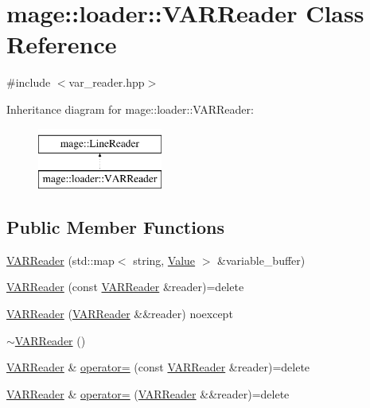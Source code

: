 \hypertarget{classmage_1_1loader_1_1_v_a_r_reader}{}\section{mage\+:\+:loader\+:\+:V\+A\+R\+Reader Class Reference}
\label{classmage_1_1loader_1_1_v_a_r_reader}


{\ttfamily \#include $<$var\+\_\+reader.\+hpp$>$}

Inheritance diagram for mage\+:\+:loader\+:\+:V\+A\+R\+Reader\+:\begin{figure}[H]
\begin{center}
\leavevmode
\includegraphics[height=2.000000cm]{classmage_1_1loader_1_1_v_a_r_reader}
\end{center}
\end{figure}
\subsection*{Public Member Functions}
\begin{DoxyCompactItemize}
\item 
\hyperlink{classmage_1_1loader_1_1_v_a_r_reader_ae06b2b97d9a0ce16047b0c8cfcd4a73f}{V\+A\+R\+Reader} (std\+::map$<$ string, \hyperlink{namespacemage_aa1fe0628487e0706e44efdc62dbdb3a2}{Value} $>$ \&variable\+\_\+buffer)
\item 
\hyperlink{classmage_1_1loader_1_1_v_a_r_reader_ab4ab4d94c90a2797ae40e54e0dd7c127}{V\+A\+R\+Reader} (const \hyperlink{classmage_1_1loader_1_1_v_a_r_reader}{V\+A\+R\+Reader} \&reader)=delete
\item 
\hyperlink{classmage_1_1loader_1_1_v_a_r_reader_aeefac440730fc89b16afa19695c956d5}{V\+A\+R\+Reader} (\hyperlink{classmage_1_1loader_1_1_v_a_r_reader}{V\+A\+R\+Reader} \&\&reader) noexcept
\item 
\hyperlink{classmage_1_1loader_1_1_v_a_r_reader_acd3bbd51ccc774d2f74a4520b6143990}{$\sim$\+V\+A\+R\+Reader} ()
\item 
\hyperlink{classmage_1_1loader_1_1_v_a_r_reader}{V\+A\+R\+Reader} \& \hyperlink{classmage_1_1loader_1_1_v_a_r_reader_a78d39071ad5103c848782ff82be397bb}{operator=} (const \hyperlink{classmage_1_1loader_1_1_v_a_r_reader}{V\+A\+R\+Reader} \&reader)=delete
\item 
\hyperlink{classmage_1_1loader_1_1_v_a_r_reader}{V\+A\+R\+Reader} \& \hyperlink{classmage_1_1loader_1_1_v_a_r_reader_a0da01229f594cb701b3e20d53be9d16e}{operator=} (\hyperlink{classmage_1_1loader_1_1_v_a_r_reader}{V\+A\+R\+Reader} \&\&reader)=delete
\end{DoxyCompactItemize}
